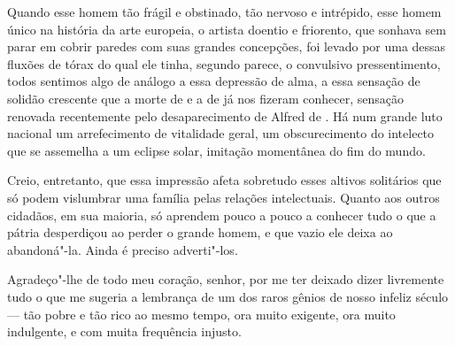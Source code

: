 Quando esse homem tão frágil e obstinado, tão nervoso e intrépido, esse
homem único na história da arte europeia, o artista doentio e
friorento, que sonhava sem parar em cobrir paredes com suas grandes
concepções, foi levado por uma dessas fluxões de tórax do qual ele
tinha, segundo parece, o convulsivo pressentimento, todos sentimos algo
de análogo a essa depressão de alma, a essa sensação de solidão
crescente que a morte de  e a de  já nos fizeram
conhecer, sensação renovada recentemente pelo desaparecimento de Alfred
de . Há num grande luto nacional um arrefecimento de vitalidade
geral, um obscurecimento do intelecto que se assemelha a um eclipse
solar, imitação momentânea do fim do mundo.

Creio, entretanto, que essa impressão afeta sobretudo esses altivos
solitários que só podem vislumbrar uma família pelas relações
intelectuais. Quanto aos outros cidadãos, em sua maioria, só aprendem
pouco a pouco a conhecer tudo o que a pátria desperdiçou ao perder o
grande homem, e que vazio ele deixa ao abandoná"-la. Ainda é preciso
adverti"-los.

Agradeço"-lhe de todo meu coração, senhor, por me ter deixado dizer
livremente tudo o que me sugeria a lembrança de um dos raros gênios de
nosso infeliz século --- tão pobre e tão rico ao mesmo tempo, ora muito
exigente, ora muito indulgente, e com muita frequência injusto.

